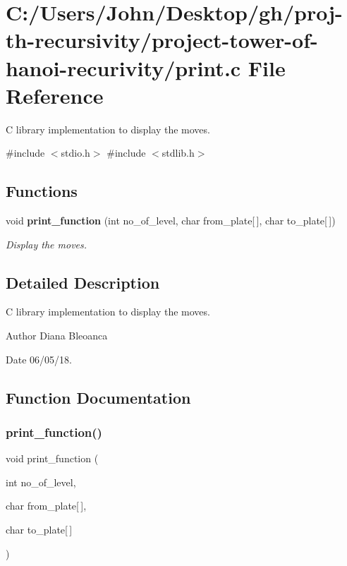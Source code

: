 \section{C\+:/\+Users/\+John/\+Desktop/gh/proj-\/th-\/recursivity/project-\/tower-\/of-\/hanoi-\/recurivity/print.c File Reference}
\label{print_8c}


C library implementation to display the moves.  


{\ttfamily \#include $<$stdio.\+h$>$}\newline
{\ttfamily \#include $<$stdlib.\+h$>$}\newline
\subsection*{Functions}
\begin{DoxyCompactItemize}
\item 
void \textbf{ print\+\_\+function} (int no\+\_\+of\+\_\+level, char from\+\_\+plate[$\,$], char to\+\_\+plate[$\,$])
\begin{DoxyCompactList}\small\item\em Display the moves. \end{DoxyCompactList}\end{DoxyCompactItemize}


\subsection{Detailed Description}
C library implementation to display the moves. 

\begin{DoxyAuthor}{Author}
Diana Bleoanca 
\end{DoxyAuthor}
\begin{DoxyDate}{Date}
06/05/18. 
\end{DoxyDate}


\subsection{Function Documentation}
\mbox{\label{print_8c_af0471cbf026592ba24b5adae3cdb02dc}} 
\subsubsection{print\+\_\+function()}
{\footnotesize\ttfamily void print\+\_\+function (\begin{DoxyParamCaption}\item[{int}]{no\+\_\+of\+\_\+level,  }\item[{char}]{from\+\_\+plate[$\,$],  }\item[{char}]{to\+\_\+plate[$\,$] }\end{DoxyParamCaption})}



